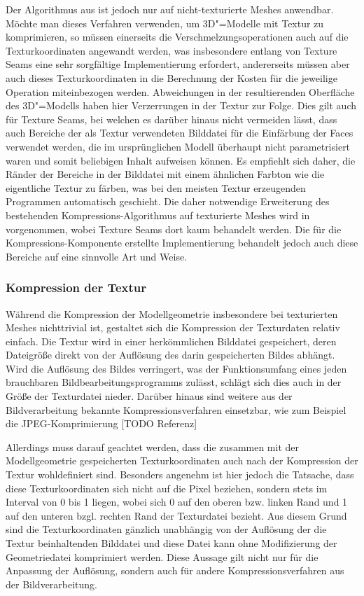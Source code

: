 Der Algorithmus aus \cite{garland1997} ist jedoch nur auf nicht-texturierte Meshes anwendbar. Möchte man dieses Verfahren verwenden, um 3D"=Modelle mit Textur zu komprimieren, so müssen einerseits die Verschmelzungsoperationen auch auf die Texturkoordinaten angewandt werden, was insbesondere entlang von Texture Seams eine sehr sorgfältige Implementierung erfordert, andererseits müssen aber auch dieses Texturkoordinaten in die Berechnung der Kosten für die jeweilige Operation miteinbezogen werden. Abweichungen in der resultierenden Oberfläche des 3D"=Modells haben hier Verzerrungen in der Textur zur Folge. Dies gilt auch für Texture Seams, bei welchen es darüber hinaus nicht vermeiden lässt, dass auch Bereiche der als Textur verwendeten Bilddatei für die Einfärbung der Faces verwendet werden, die im ursprünglichen Modell überhaupt nicht parametrisiert waren und somit beliebigen Inhalt aufweisen können. Es empfiehlt sich daher, die Ränder der Bereiche in der Bilddatei mit einem ähnlichen Farbton wie die eigentliche Textur zu färben, was bei den meisten Textur erzeugenden Programmen automatisch geschieht. Die daher notwendige Erweiterung des bestehenden Kompressions-Algorithmus auf texturierte Meshes wird in \cite{garland1998} vorgenommen, wobei Texture Seams dort kaum behandelt werden. Die für die Kompressions-Komponente erstellte Implementierung behandelt jedoch auch diese Bereiche auf eine sinnvolle Art und Weise.

\subsubsection{Kompression der Textur}

Während die Kompression der Modellgeometrie insbesondere bei texturierten Meshes nichttrivial ist, gestaltet sich die Kompression der Texturdaten relativ einfach. Die Textur wird in einer herkömmlichen Bilddatei gespeichert, deren Dateigröße direkt von der Auflösung des darin gespeicherten Bildes abhängt. Wird die Auflösung des Bildes verringert, was der Funktionsumfang eines jeden brauchbaren Bildbearbeitungsprogramms zulässt, schlägt sich dies auch in der Größe der Texturdatei nieder. Darüber hinaus sind weitere aus der Bildverarbeitung bekannte Kompressionsverfahren einsetzbar, wie zum Beispiel die JPEG-Komprimierung [TODO Referenz]

Allerdings muss darauf geachtet werden, dass die zusammen mit der Modellgeometrie gespeicherten Texturkoordinaten auch nach der Kompression der Textur wohldefiniert sind. Besonders angenehm ist hier jedoch die Tatsache, dass diese Texturkoordinaten sich nicht auf die Pixel beziehen, sondern stets im Interval von 0 bis 1 liegen, wobei sich 0 auf den oberen bzw. linken Rand und  1 auf den unteren bzgl. rechten Rand der Texturdatei bezieht. Aus diesem Grund sind die Texturkoordinaten gänzlich unabhängig von der Auflösung der die Textur beinhaltenden Bilddatei und diese Datei kann ohne Modifizierung der Geometriedatei komprimiert werden. Diese Aussage gilt nicht nur für die Anpassung der Auflösung, sondern auch für andere Kompressionsverfahren aus der Bildverarbeitung.
